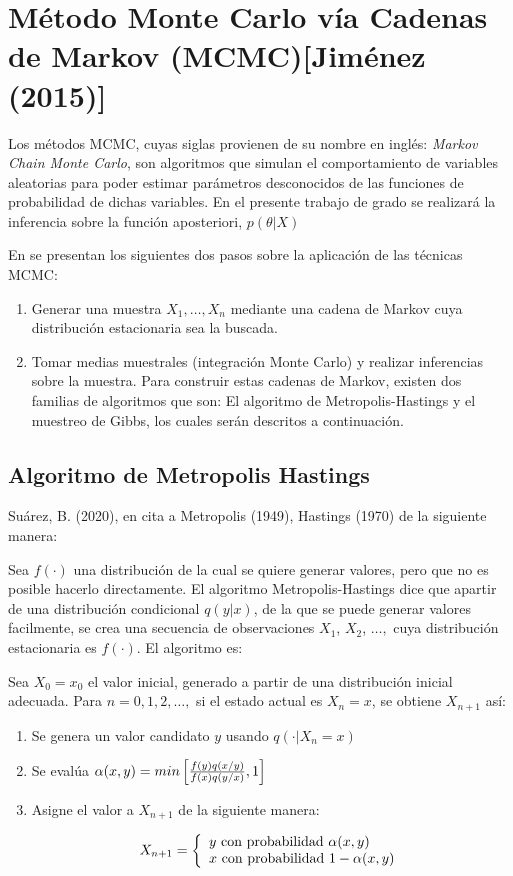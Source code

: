 \section{Método Monte Carlo vía Cadenas de Markov (MCMC)[Jiménez (2015)]} 

Los métodos MCMC, cuyas siglas provienen de su nombre en inglés: \textit{Markov Chain Monte Carlo}, son algoritmos que simulan el comportamiento de variables aleatorias para poder estimar parámetros desconocidos de las funciones de probabilidad de dichas variables. En el presente trabajo de grado se realizará la inferencia sobre la función aposteriori, $p(\theta|X)$

En \cite{MCMC} se presentan los siguientes dos pasos sobre la aplicación de las técnicas MCMC: 

\begin{enumerate}
\item Generar una muestra $X_1, \dots, X_n$ mediante una cadena de Markov cuya distribución estacionaria sea la buscada. 
\item Tomar medias muestrales (integración Monte Carlo) y realizar inferencias sobre la muestra. Para construir estas cadenas de Markov, existen dos familias de algoritmos que son: El algoritmo de Metropolis-Hastings y el muestreo de Gibbs, los cuales serán descritos a continuación. 
\end{enumerate}
\subsection{Algoritmo de Metropolis Hastings}

Suárez, B. (2020), en \cite{tesisbiviana} cita a Metropolis (1949), Hastings (1970) de la siguiente manera: 

Sea $f(\cdot)$ una distribución de la cual se quiere generar valores, pero que no es posible hacerlo directamente. El algoritmo Metropolis-Hastings dice que apartir de una distribución condicional $q(y|x)$, de la que se puede generar valores facilmente, se crea una secuencia de observaciones $X_1$, $X_2$, $\dots,$ cuya distribución estacionaria es $f(\cdot)$. El algoritmo es: 

Sea $X_0=x_0$ el valor inicial, generado a partir de una distribución inicial adecuada. Para $n=0,1,2,\dots,$ si el estado actual es $X_n=x$, se obtiene $X_{n+1}$ así: 

\begin{enumerate}
\item Se genera un valor candidato $y$ usando $q(\cdot | X_n=x)$
\item Se evalúa $\alpha(x,y)=min \left[ \frac{f(y)q(x/y)}{f(x)q(y/x)},1\right]$

\item Asigne el valor a $X_{n+1}$ de la siguiente manera: 

\begin{displaymath}
X_{n+1} = \left\{ \begin{array}{l}
y \text{ con probabilidad } \alpha(x,y) \\
x \text{ con probabilidad } 1-\alpha(x,y) 
\end{array}
\right.
\end{displaymath}
\end{enumerate}

